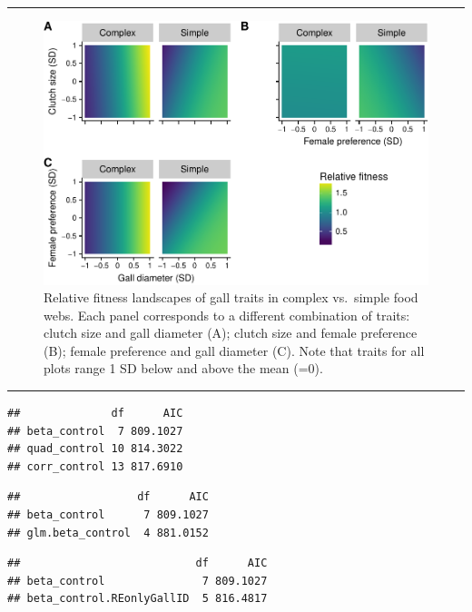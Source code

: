 \documentclass[]{elsarticle} %
\makeatletter
\def\maxwidth{\ifdim\Gin@nat@width>\linewidth\linewidth
\else\Gin@nat@width\fi}
\let\Oldincludegraphics\includegraphics
\renewcommand{\includegraphics}[1]{\Oldincludegraphics[width=\maxwidth]{#1}}
\makeatother
\begin{document}
\begin{center}\rule{0.5\linewidth}{\linethickness}\end{center}

\begin{figure}[htbp]
\centering
\includegraphics{elsevier_test_files/figure-latex/Figure 3 Multivariate Landscapes-1.pdf}
\caption{Relative fitness landscapes of gall traits in complex
vs.~simple food webs. Each panel corresponds to a different combination
of traits: clutch size and gall diameter (A); clutch size and female
preference (B); female preference and gall diameter (C). Note that
traits for all plots range 1 SD below and above the mean (=0).}
\end{figure}

\begin{center}\rule{0.5\linewidth}{\linethickness}\end{center}

\begin{verbatim}
##              df      AIC
## beta_control  7 809.1027
## quad_control 10 814.3022
## corr_control 13 817.6910
\end{verbatim}

\begin{verbatim}
##                  df      AIC
## beta_control      7 809.1027
## glm.beta_control  4 881.0152
\end{verbatim}

\begin{verbatim}
##                           df      AIC
## beta_control               7 809.1027
## beta_control.REonlyGallID  5 816.4817
\end{verbatim}
\end{document}

